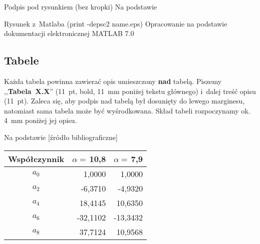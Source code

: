 \documentclass[skorowidz,skroty]{dyplomWEZUT}
\begin{document}
%
%

{Podpis pod rysunkiem (bez kropki)\label{fig:rys}}
{Na podstawie~\cite{Opoka2001}}

{Rysunek z~Matlaba (print -depsc2 name.eps)\label{fig:rys2}}
{Opracowanie na podstawie dokumentacji elektronicznej MATLAB 7.0~\cite{Mathworks2004}}

\subsection{Tabele}

Każda tabela powinna zawierać opis umieszczony \textbf{nad} tabelą. Piszemy ,,\textbf{Tabela~X.X}'' (11~pt, bold, 11~mm poniżej tekstu głównego) i~dalej treść opisu (11~pt). Zaleca się, aby podpis nad tabelą był dosunięty do lewego marginesu, natomiast sama tabela może być wyśrodkowana. Skład tabeli rozpoczynamy ok. 4~mm poniżej jej opisu.

%

{Na podstawie [źródło bibliograficzne]}
{\begin{tabular}{c|r|r}
Współczynnik & $α=\,$10,8 & $α=\,$7,9 \\\hline\hline
$a_0$ &   1,0000 &   1,0000\\
$a_2$ &  -6,3710 &  -4,9320\\
$a_4$ &  18,4145 &  10,6350\\
$a_6$ & -32,1102 & -13,3432\\
$a_8$ &  37,7124 &  10,9568\\
\end{tabular}}
\end{document}
